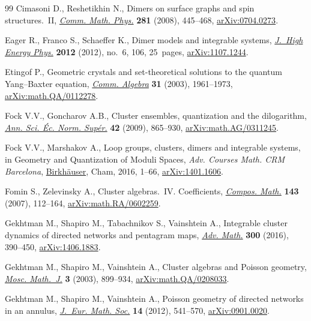 \documentclass[10pt,a4paper]{amsart}
\numberwithin{equation}{section}
\begin{document}
\begin{thebibliography}{99}
Cimasoni D., Reshetikhin N., Dimers on surface graphs and spin
 structures.~{II},
 \href{https://doi.org/10.1007/s00220-008-0488-3}{\textit{Comm. Math. Phys.}}
 \textbf{281} (2008), 445--468,
 \href{http://arxiv.org/abs/0704.0273}{arXiv:0704.0273}.

Eager R., Franco S., Schaeffer K., Dimer models and integrable systems,
 \href{https://doi.org/10.1007/JHEP06(2012)106}{\textit{J.~High Energy Phys.}}
 \textbf{2012} (2012), no.~6, 106, 25~pages,
 \href{http://arxiv.org/abs/1107.1244}{arXiv:1107.1244}.

Etingof P., Geometric crystals and set-theoretical solutions to the quantum
 {Y}ang--{B}axter equation,
 \href{https://doi.org/10.1081/AGB-120018516}{\textit{Comm. Algebra}}
 \textbf{31} (2003), 1961--1973,
 \href{http://arxiv.org/abs/math.QA/0112278}{arXiv:math.QA/0112278}.

Fock V.V., Goncharov A.B., Cluster ensembles, quantization and the dilogarithm,
 \href{https://doi.org/10.24033/asens.2112}{\textit{Ann. Sci. \'Ec. Norm.
 Sup\'er.}} \textbf{42} (2009), 865--930,
 \href{http://arxiv.org/abs/math.AG/0311245}{arXiv:math.AG/0311245}.

Fock V.V., Marshakov A., Loop groups, clusters, dimers and integrable systems,
 in Geometry and Quantization of Moduli Spaces, \textit{Adv. Courses Math. CRM
 Barcelona}, \href{https://doi.org/10.1007/978-3-319-33578-0_1}{Birkh\"auser},
 Cham, 2016, 1--66, \href{http://arxiv.org/abs/1401.1606}{arXiv:1401.1606}.

Fomin S., Zelevinsky A., Cluster algebras.~{IV}. {C}oefficients,
 \href{https://doi.org/10.1112/S0010437X06002521}{\textit{Compos. Math.}}
 \textbf{143} (2007), 112--164,
 \href{http://arxiv.org/abs/math.RA/0602259}{arXiv:math.RA/0602259}.

Gekhtman M., Shapiro M., Tabachnikov S., Vainshtein A., Integrable cluster
 dynamics of directed networks and pentagram maps,
 \href{https://doi.org/10.1016/j.aim.2016.03.023}{\textit{Adv. Math.}}
 \textbf{300} (2016), 390--450,
 \href{http://arxiv.org/abs/1406.1883}{arXiv:1406.1883}.

Gekhtman M., Shapiro M., Vainshtein A., Cluster algebras and {P}oisson
 geometry,
 \href{https://doi.org/10.17323/1609-4514-2003-3-3-899-934}{\textit{Mosc.
 Math.~J.}} \textbf{3} (2003), 899--934,
 \href{http://arxiv.org/abs/math.QA/0208033}{arXiv:math.QA/0208033}.

Gekhtman M., Shapiro M., Vainshtein A., Poisson geometry of directed networks
 in an annulus, \href{https://doi.org/10.4171/JEMS/311}{\textit{J.~Eur. Math.
 Soc.}} \textbf{14} (2012), 541--570,
 \href{http://arxiv.org/abs/0901.0020}{arXiv:0901.0020}.


\end{thebibliography}
\end{document}

